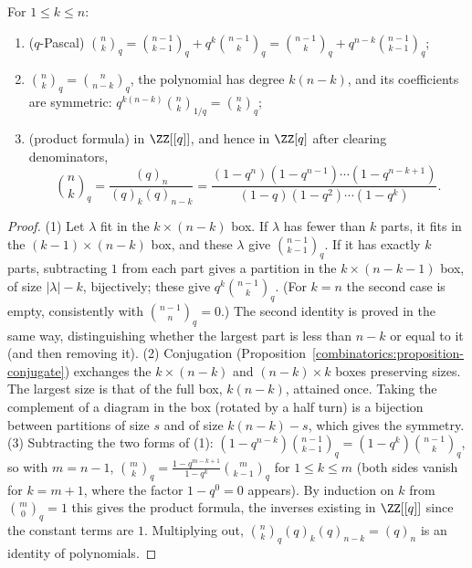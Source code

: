\begin{proposition}\label{generating-functions:proposition-gaussian}
For $1 \leq k \leq n$:
\begin{enumerate}
\item ($q$-Pascal) $\binom{n}{k}_q = \binom{n - 1}{k - 1}_q + q^k\binom{n - 1}{k}_q = \binom{n - 1}{k}_q + q^{n-k}\binom{n - 1}{k - 1}_q$;
\item $\binom{n}{k}_q = \binom{n}{n - k}_q$, the polynomial has degree $k(n - k)$, and its coefficients are symmetric: $q^{k(n-k)}\binom{n}{k}_{1/q} = \binom{n}{k}_q$;
\item (product formula) in $\ZZ[[q]]$, and hence in $\ZZ[q]$ after clearing denominators,
\[
\binom{n}{k}_q = \frac{(q)_n}{(q)_k(q)_{n-k}} = \frac{(1 - q^n)(1 - q^{n-1}) \cdots (1 - q^{n-k+1})}{(1 - q)(1 - q^2) \cdots (1 - q^k)}.
\]
\end{enumerate}
\end{proposition}

\begin{proof}
(1) Let $\lambda$ fit in the $k \times (n - k)$ box. If $\lambda$ has fewer than $k$ parts, it fits in the $(k - 1) \times (n - k)$ box, and these $\lambda$ give $\binom{n - 1}{k - 1}_q$. If it has
exactly $k$ parts, subtracting $1$ from each part gives a partition in the $k \times (n - k - 1)$ box, of size $|\lambda| - k$, bijectively; these give $q^k\binom{n - 1}{k}_q$. (For $k = n$ the second
case is empty, consistently with $\binom{n-1}{n}_q = 0$.) The second identity is proved in the same way, distinguishing whether the largest part is less than $n - k$ or equal to it (and then removing
it).
(2) Conjugation (Proposition~\ref{combinatorics:proposition-conjugate}) exchanges the $k \times (n - k)$ and $(n - k) \times k$ boxes preserving sizes. The largest size is that of the full box,
$k(n - k)$, attained once. Taking the complement of a diagram in the box (rotated by a half turn) is a bijection between partitions of size $s$ and of size $k(n - k) - s$, which gives the symmetry.
(3) Subtracting the two forms of (1): $(1 - q^{n-k})\binom{n - 1}{k - 1}_q = (1 - q^k)\binom{n - 1}{k}_q$, so with $m = n - 1$, $\binom{m}{k}_q = \frac{1 - q^{m-k+1}}{1 - q^k}\binom{m}{k - 1}_q$ for
$1 \leq k \leq m$ (both sides vanish for $k = m + 1$, where the factor $1 - q^0 = 0$ appears). By induction on $k$ from $\binom{m}{0}_q = 1$ this gives the product formula, the inverses existing in
$\ZZ[[q]]$ since the constant terms are $1$. Multiplying out, $\binom{n}{k}_q(q)_k(q)_{n-k} = (q)_n$ is an identity of polynomials.
\end{proof}

